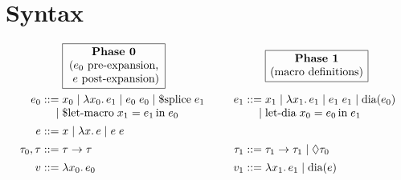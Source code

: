 \documentclass{article}
\begin{document}
\section{Syntax}

\noindent
\[\arraycolsep=1.4pt
\begin{array}{rlcrl}
                 & \boxed{\text{\parbox{8.5em}{\centering
                     \textbf{Phase 0}\\
                     ($e_0$ pre-expansion,\\
                     \hphantom{(}$e$ post-expansion)
                   }}}
                 & \hspace{2em} &
                 & \boxed{\text{\parbox{8.5em}{\centering
                     \textbf{Phase 1}\\
                     (macro definitions)
                   }}}
                \vspace{1ex}
                \\
         e_0 ::= & x_0
              \mid \lambda x_0.\,e_1
              \mid e_0\;e_0
              \mid \text{\$splice}\;e_1
                 & \hspace{2em} &
         e_1 ::= & x_1
              \mid \lambda x_1.\,e_1
              \mid e_1\;e_1
              \mid \text{dia}(e_0)
                \\
            \mid & \text{\$let-macro}\;x_1 = e_1\,\text{in}\;e_0
                 & \hspace{2em}
                 & 
            \mid & \text{let-dia}\;x_0 = e_0\,\text{in}\;e_1
                \vspace{1ex}
                \\
           e ::= & x
              \mid \lambda x.\,e
              \mid e\;e
                \vspace{1ex}
                \\
\tau_0, \tau ::= & \tau \to \tau
                 & \hspace{2em} &
      \tau_1 ::= & \tau_1 \to \tau_1
              \mid \Diamond \tau_0
                \vspace{1ex}
                \\
           v ::= & \lambda x_0.\,e_0
                 & \hspace{2em} &
         v_1 ::= & \lambda x_1.\,e_1
              \mid \text{dia}(e)
\end{array}
\]
\end{document}
